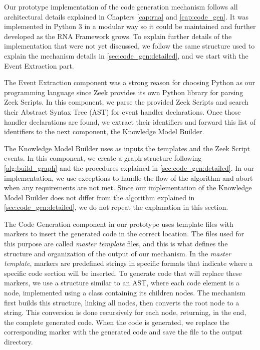 Our prototype implementation of the code generation mechanism follows all architectural details explained in Chapters \ref{cap:rna} and \ref{cap:code_gen}. It was implemented in Python 3 in a modular way so it could be maintained and further developed as the RNA Framework grows. To explain further details of the implementation that were not yet discussed, we follow the same structure used to explain the mechanism details in \autoref{sec:code_gen:detailed}, and we start with the Event Extraction part.

The Event Extraction component was a strong reason for choosing Python as our programming language since Zeek provides its own Python library for parsing Zeek Scripts. In this component, we parse the provided Zeek Scripts and search their Abstract Syntax Tree (AST) for event handler declarations. Once those handler declarations are found, we extract their identifiers and forward this list of identifiers to the next component, the Knowledge Model Builder.

The Knowledge Model Builder uses as inputs the templates and the Zeek Script events. In this component, we create a graph structure following \autoref{alg:build_graph} and the procedures explained in \autoref{sec:code_gen:detailed}. In our implementation, we use exceptions to handle the flow of the algorithm and abort when any requirements are not met. Since our implementation of the Knowledge Model Builder does not differ from the algorithm explained in \autoref{sec:code_gen:detailed}, we do not repeat the explanation in this section.

\vspace{1em}

The Code Generation component in our prototype uses template files with markers to insert the generated code in the correct location. The files used for this purpose are called \textit{master template} files, and this is what defines the structure and organization of the output of our mechanism. In the \textit{master template}, markers are predefined strings in specific formats that indicate where a specific code section will be inserted. To generate code that will replace these markers, we use a structure similar to an AST, where each code element is a node, implemented using a class containing its children nodes. The mechanism first builds this structure, linking all nodes, then converts the root node to a string. This conversion is done recursively for each node, returning, in the end, the complete generated code. When the code is generated, we replace the corresponding marker with the generated code and save the file to the output directory.

